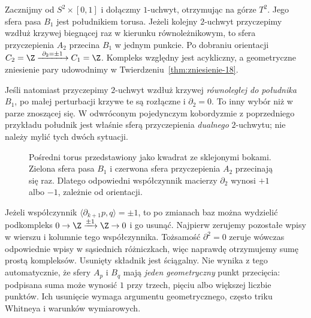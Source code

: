 \begin{przyklad}
\label{prz:meridian-longitude-18}
Zacznijmy od $S^2\times[0,1]$ i
dołączmy $1$-uchwyt, otrzymując na górze $T^2$.
Jego sfera pasa $B_1$ jest południkiem
torusa. Jeżeli kolejny $2$-uchwyt przyczepimy
wzdłuż krzywej biegnącej raz w kierunku
równoleżnikowym, to sfera przyczepienia
$A_2$ przecina $B_1$ w jednym punkcie.
Po dobraniu orientacji
$C_2=\Z\xrightarrow{\ \partial_2=\pm1\ }
 C_1=\Z$.
Kompleks względny jest acykliczny,
a geometryczne zniesienie pary
udowodnimy w
Twierdzeniu~\ref{thm:zniesienie-18}.

Jeśli natomiast przyczepimy $2$-uchwyt
wzdłuż krzywej \emph{równoległej do
południka} $B_1$, po małej perturbacji
krzywe te są rozłączne i $\partial_2=0$.
To inny wybór niż w parze znoszącej się.
W odwróconym pojedynczym kobordyzmie
z poprzedniego przykładu południk
jest właśnie sferą przyczepienia
\emph{dualnego} $2$-uchwytu;
nie należy mylić tych dwóch sytuacji.
\end{przyklad}

\begin{figure}[htbp]
\centering
{}
\caption{Pośredni torus przedstawiony jako kwadrat
ze sklejonymi bokami. Zielona sfera pasa
$B_1$ i czerwona sfera przyczepienia
$A_2$ przecinają się raz. Dlatego odpowiedni
współczynnik macierzy $\partial_2$ wynosi
$+1$ albo $-1$, zależnie od orientacji.}
\label{fig:przeciecie-uchwytow-18}
\end{figure}

\begin{uwaga}
Jeżeli współczynnik
$\langle\partial_{k+1}p,q\rangle=\pm1$,
to po zmianach baz można wydzielić podkompleks
$0\to\Z\xrightarrow{\pm1}\Z\to0$ i go usunąć.
Najpierw zerujemy pozostałe wpisy w wierszu i kolumnie
tego współczynnika. Tożsamość $\partial^2=0$
zeruje wówczas odpowiednie wpisy w sąsiednich
różniczkach, więc naprawdę otrzymujemy sumę prostą
kompleksów. Usunięty składnik jest ściągalny.
Nie wynika z tego automatycznie, że
sfery $A_p$ i $B_q$ mają \emph{jeden
geometryczny} punkt przecięcia:
podpisana suma może wynosić $1$
przy trzech, pięciu albo większej
liczbie punktów. Ich usunięcie wymaga
argumentu geometrycznego, często
triku Whitneya i warunków wymiarowych.
\end{uwaga}

